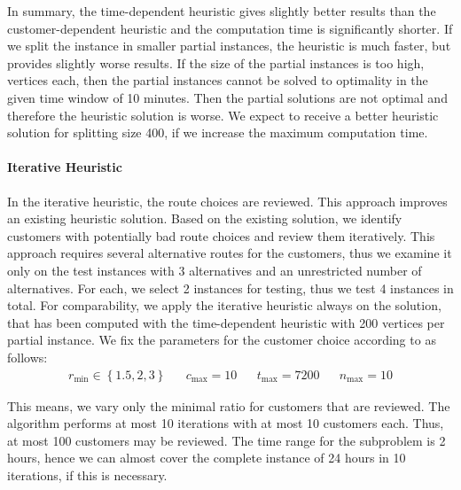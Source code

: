 In summary, the time-dependent heuristic gives slightly better results than the customer-dependent heuristic and the computation time is significantly shorter. If we split the instance in smaller partial instances, the heuristic is much faster, but provides slightly worse results. If the size of the partial instances is too high,  vertices each, then the partial instances cannot be solved to optimality in the given time window of 10 minutes. Then the partial solutions are not optimal and therefore the heuristic solution is worse. We expect to receive a better heuristic solution for splitting size 400, if we increase the maximum computation time. 

\paragraph{Iterative Heuristic} \parfill

In the iterative heuristic, the route choices are reviewed. This approach improves an existing heuristic solution. Based on the existing solution, we identify customers with potentially bad route choices and review them iteratively. This approach requires several alternative routes for the customers, thus we examine it only on the test instances with 3 alternatives and an unrestricted number of alternatives. For each, we select 2 instances for testing, thus we test 4 instances in total. For comparability, we apply the iterative heuristic always on the solution, that has been computed with the time-dependent heuristic with 200 vertices per partial instance. We fix the parameters for the customer choice according to  as follows:
\begin{align*}
	r_{\min} \in\left\{1.5,2,3\right\} && c_{\max} = 10 && t_{\max} = 7200 && n_{\max} = 10
\end{align*}

This means, we vary only the minimal ratio for customers that are reviewed. The algorithm performs at most 10 iterations with at most 10 customers each. Thus, at most 100 customers may be reviewed. The time range for the subproblem is 2 hours, hence we can almost cover the complete instance of 24 hours in 10 iterations, if this is necessary.

